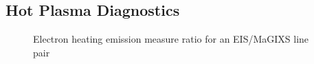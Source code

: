 \documentclass[apj]{emulateapj}
\begin{document}
	\subsection{Hot Plasma Diagnostics}
	\label{subsec:diagnostics}
	\begin{figure}
		\centering
		\caption{Electron heating emission measure ratio for an EIS/MaGIXS line pair}
	\end{figure}
\end{document}
